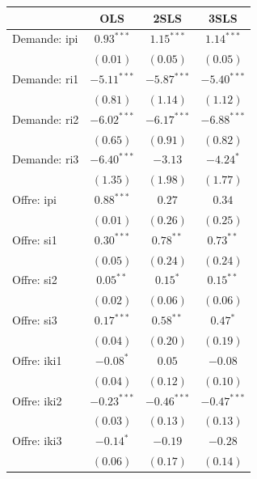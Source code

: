 \documentclass[11pt,]{article}
\begin{document}
\begin{table}
\begin{center}
\begin{tabular}{l c c c }
\hline
 & OLS & 2SLS & 3SLS \\
\hline
Demande: ipi        & $0.93^{***}$  & $1.15^{***}$  & $1.14^{***}$  \\
                    & $(0.01)$      & $(0.05)$      & $(0.05)$      \\
Demande: ri1        & $-5.11^{***}$ & $-5.87^{***}$ & $-5.40^{***}$ \\
                    & $(0.81)$      & $(1.14)$      & $(1.12)$      \\
Demande: ri2        & $-6.02^{***}$ & $-6.17^{***}$ & $-6.88^{***}$ \\
                    & $(0.65)$      & $(0.91)$      & $(0.82)$      \\
Demande: ri3        & $-6.40^{***}$ & $-3.13$       & $-4.24^{*}$   \\
                    & $(1.35)$      & $(1.98)$      & $(1.77)$      \\
Offre: ipi          & $0.88^{***}$  & $0.27$        & $0.34$        \\
                    & $(0.01)$      & $(0.26)$      & $(0.25)$      \\
Offre: si1          & $0.30^{***}$  & $0.78^{**}$   & $0.73^{**}$   \\
                    & $(0.05)$      & $(0.24)$      & $(0.24)$      \\
Offre: si2          & $0.05^{**}$   & $0.15^{*}$    & $0.15^{**}$   \\
                    & $(0.02)$      & $(0.06)$      & $(0.06)$      \\
Offre: si3          & $0.17^{***}$  & $0.58^{**}$   & $0.47^{*}$    \\
                    & $(0.04)$      & $(0.20)$      & $(0.19)$      \\
Offre: iki1         & $-0.08^{*}$   & $0.05$        & $-0.08$       \\
                    & $(0.04)$      & $(0.12)$      & $(0.10)$      \\
Offre: iki2         & $-0.23^{***}$ & $-0.46^{***}$ & $-0.47^{***}$ \\
                    & $(0.03)$      & $(0.13)$      & $(0.13)$      \\
Offre: iki3         & $-0.14^{*}$   & $-0.19$       & $-0.28$       \\
                    & $(0.06)$      & $(0.17)$      & $(0.14)$      \\

\end{tabular}
\end{center}
\end{table}
\end{document}
